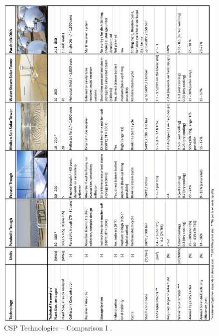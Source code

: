 \documentclass[Master,MEE,english]{twbook}%
\begin{document}
\begin{figure}[h]  
\centering
\includegraphics[height=0.95\textheight]{FIG/CSPOverview1}
\caption[CSP Technologies – Comparison I]{CSP Technologies – Comparison I \cite{Fichtner2010}.}\label{CSPOverview1}
\end{figure}
\end{document}
